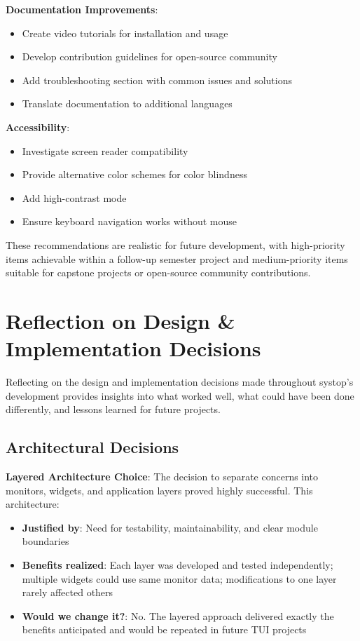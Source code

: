 \documentclass[12pt,a4paper,oneside]{report}
\begin{document}
\textbf{Documentation Improvements}:
\begin{itemize}
    \item Create video tutorials for installation and usage
    \item Develop contribution guidelines for open-source community
    \item Add troubleshooting section with common issues and solutions
    \item Translate documentation to additional languages
\end{itemize}

\textbf{Accessibility}:
\begin{itemize}
    \item Investigate screen reader compatibility
    \item Provide alternative color schemes for color blindness
    \item Add high-contrast mode
    \item Ensure keyboard navigation works without mouse
\end{itemize}

These recommendations are realistic for future development, with high-priority items achievable within a follow-up semester project and medium-priority items suitable for capstone projects or open-source community contributions.

\section{Reflection on Design \& Implementation Decisions}
\label{sec:reflection}

Reflecting on the design and implementation decisions made throughout systop's development provides insights into what worked well, what could have been done differently, and lessons learned for future projects.

\subsection{Architectural Decisions}

\textbf{Layered Architecture Choice}: The decision to separate concerns into monitors, widgets, and application layers proved highly successful. This architecture:

\begin{itemize}
    \item \textbf{Justified by}: Need for testability, maintainability, and clear module boundaries
    \item \textbf{Benefits realized}: Each layer was developed and tested independently; multiple widgets could use same monitor data; modifications to one layer rarely affected others
    \item \textbf{Would we change it?}: No. The layered approach delivered exactly the benefits anticipated and would be repeated in future TUI projects
\end{itemize}
\end{document}
